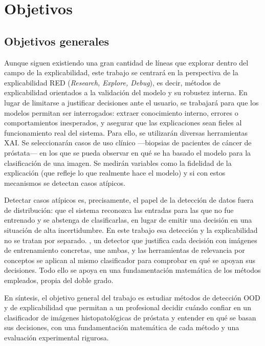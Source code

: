 \section{Objetivos}\label{sec:objetivos}

\subsection{Objetivos generales}\label{sec:objetivos-generales}

Aunque siguen existiendo una gran cantidad de líneas que explorar dentro del campo de la explicabilidad, este trabajo se centrará en la perspectiva de la explicabilidad RED (\emph{Research, Explore, Debug}), es decir, métodos de explicabilidad orientados a la validación del modelo y su robustez interna. En lugar de limitarse a justificar decisiones ante el usuario, se trabajará para que los modelos permitan ser interrogados: extraer conocimiento interno, errores o comportamientos inesperados, y asegurar que las explicaciones sean fieles al funcionamiento real del sistema. Para ello, se utilizarán diversas herramientas XAI. Se seleccionarán casos de uso clínico ---biopsias de pacientes de cáncer de próstata--- en los que se pueda observar en qué se ha basado el modelo para la clasificación de una imagen. Se medirán variables como la fidelidad de la explicación (que refleje lo que realmente hace el modelo) y si con estos mecanismos se detectan casos atípicos.

Detectar casos atípicos es, precisamente, el papel de la detección de datos fuera de distribución: que el sistema reconozca las entradas para las que no fue entrenado y se abstenga de clasificarlas, en lugar de emitir una decisión en una situación de alta incertidumbre. En este trabajo esa detección y la explicabilidad no se tratan por separado. \stoodx, un detector que justifica cada decisión con imágenes de entrenamiento concretas, une ambas, y las herramientas de relevancia por conceptos se aplican al mismo clasificador para comprobar en qué se apoyan sus decisiones. Todo ello se apoya en una fundamentación matemática de los métodos empleados, propia del doble grado.

En síntesis, el objetivo general del trabajo es estudiar métodos de detección OOD y de explicabilidad que permitan a un profesional decidir cuándo confiar en un clasificador de imágenes histopatológicas de próstata y entender en qué se basan sus decisiones, con una fundamentación matemática de cada método y una evaluación experimental rigurosa.

